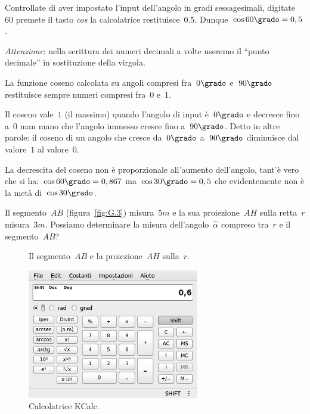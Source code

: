 Controllate di aver impostato l'input dell'angolo in gradi sessagesimali,
digitate~$60 $ premete il tasto \emph{cos} la calcolatrice restituisce~$0.5$.
Dunque~$\cos 60\grado=0,5$.

\emph{Attenzione}: nella scrittura dei numeri decimali a volte useremo 
il ``punto decimale'' in sostituzione della virgola.

\osservazione
\begin{enumeratea}
\item La funzione coseno calcolata su angoli compresi fra~$0\grado$ e~$90\grado$ 
restituisce sempre numeri compresi fra~$0$ e~$1$.
\item Il coseno vale~$1$ (il massimo) quando l'angolo di input è~$0\grado$ e 
decresce fino a~$0$ man mano che l'angolo immesso cresce fino
   a~$90\grado$. Detto in altre parole: il coseno di un angolo che cresce 
da~$0\grado$ a~$90\grado$ diminuisce dal valore~$1$ al valore~$0$.
\item La decrescita del coseno non è proporzionale all'aumento dell'angolo, 
tant'è vero che si ha:~$\cos 60\grado=0,867$
   ma~$\cos 30\grado=0,5$ che evidentemente non è la metà di~$\cos 30\grado$.
\end{enumeratea}

\begin{problema}
Il segmento~${AB}$ (figura~\ref{fig:G.3}) misura~$5\unit{m}$ e la sua 
proiezione~${AH}$ sulla retta~$r$ misura~$3\unit{m}$.
Possiamo determinare la misura dell'angolo~${\hat{\alpha}}$ compreso tra~$r$ e 
il segmento~${AB}$?

\end{problema}
\begin{inaccessibleblock}
 \begin{figure}[t]
\begin{minipage}[t]{.45\textwidth}
 \centering
 
  \caption{Il segmento~$AB$ e la proiezione~${AH}$ sulla~$r$.}\label{fig:G.3}
\end{minipage}\hfil
\begin{minipage}[t]{.45\textwidth}
 \centering

\begin{inaccessibleblock}
 \includegraphics[scale=.55]{img/kcalc.png}
\end{inaccessibleblock}
 \caption{Calcolatrice KCalc.}\label{fig:G.4}
\end{minipage}
\end{figure}
\end{inaccessibleblock}

